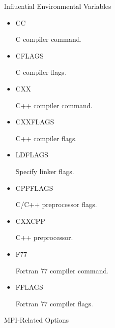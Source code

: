 \documentclass[12pt,relax]{SANDreport}
\begin{document}
 Influential Environmental Variables

\begin{itemize}
\item CC 

C compiler command.

\item CFLAGS 

C compiler flags.

\item CXX 

C++ compiler command.

\item CXXFLAGS 

C++ compiler flags.

\item LDFLAGS 

Specify linker flags.

\item CPPFLAGS 

C/C++ preprocessor flags.

\item CXXCPP 

C++ preprocessor.

\item F77 

Fortran 77 compiler command.

\item FFLAGS 

Fortran 77 compiler flags.
\end{itemize}

MPI-Related Options
\end{document}
